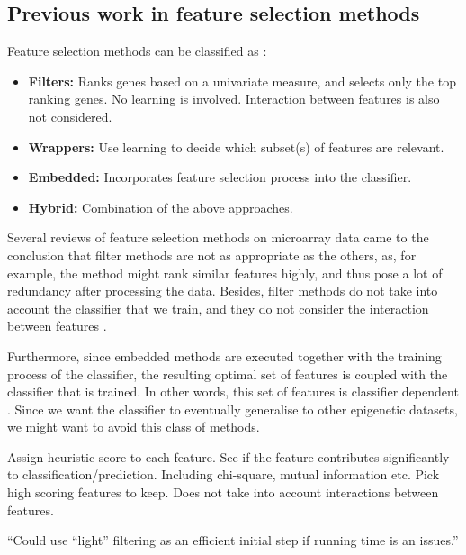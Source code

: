 \documentclass[12pt, twoside, a4paper]{report}
\begin{document}
\subsection{Previous work in feature selection methods} \label{bg:fs:previous}

Feature selection methods can be classified as \cite{RefWorks:117, RefWorks:118}:
\begin{itemize}
\item \textbf{Filters:} Ranks genes based on a univariate measure, and selects only the top ranking genes. No learning is involved. Interaction between features is also not considered.
\item \textbf{Wrappers:} Use learning to decide which subset(s) of features are relevant.
\item \textbf{Embedded:} Incorporates feature selection process into the classifier.
\item \textbf{Hybrid:} Combination of the above approaches.
\end{itemize}

Several reviews of feature selection methods on microarray data \cite{RefWorks:117, RefWorks:118} came to the conclusion that filter methods are not as appropriate as the others, as, for example, the method might rank similar features highly, and thus pose a lot of redundancy after processing the data. Besides, filter methods do not take into account the classifier that we train, and they do not consider the interaction between features \cite{RefWorks:119}.

Furthermore, since embedded methods are executed together with the training process of the classifier, the resulting optimal set of features is coupled with the classifier that is trained. In other words, this set of features is classifier dependent \cite{RefWorks:118}. Since we want the classifier to eventually generalise to other epigenetic datasets, we might want to avoid this class of methods. 

Assign heuristic score to each feature. See if the feature contributes significantly to classification/prediction. Including chi-square, mutual information etc. Pick high scoring features to keep. Does not take into account interactions between features.

``Could use ``light'' filtering as an efficient initial step if running time is an issues.''	
\end{document}
